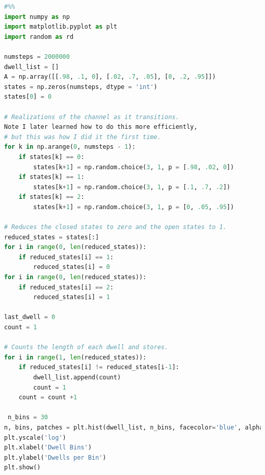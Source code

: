 \documentclass{article}
\begin{document}
\begin{lstlisting}[language = Python]
#%%
import numpy as np
import matplotlib.pyplot as plt
import random as rd

numsteps = 2000000
dwell_list = []
A = np.array([[.98, .1, 0], [.02, .7, .05], [0, .2, .95]])
states = np.zeros(numsteps, dtype = 'int')
states[0] = 0

# Realizations of the channel as it transitions. 
Note I later learned how to do this more efficiently,
# but this was how I did it the first time.
for k in np.arange(0, numsteps - 1):
    if states[k] == 0:
        states[k+1] = np.random.choice(3, 1, p = [.98, .02, 0])
    if states[k] == 1:
        states[k+1] = np.random.choice(3, 1, p = [.1, .7, .2])
    if states[k] == 2:
        states[k+1] = np.random.choice(3, 1, p = [0, .05, .95])

# Reduces the closed states to zero and the open states to 1.
reduced_states = states[:]
for i in range(0, len(reduced_states)):
    if reduced_states[i] == 1:
        reduced_states[i] = 0
for i in range(0, len(reduced_states)):
    if reduced_states[i] == 2:
        reduced_states[i] = 1

last_dwell = 0
count = 1

# Counts the length of each dwell and stores.
for i in range(1, len(reduced_states)):
    if reduced_states[i] != reduced_states[i-1]:
        dwell_list.append(count)
        count = 1
    count = count +1

 n_bins = 30
n, bins, patches = plt.hist(dwell_list, n_bins, facecolor='blue', alpha=0.5)
plt.yscale('log')
plt.xlabel('Dwell Bins')
plt.ylabel('Dwells per Bin')
plt.show()
\end{lstlisting}
\end{document}
